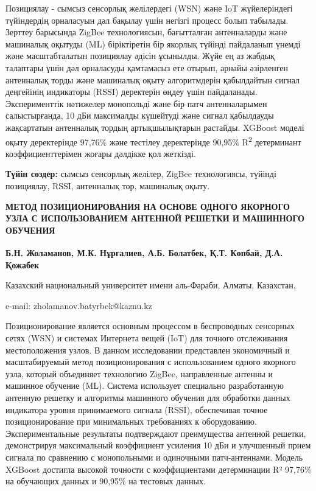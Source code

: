 Позициялау - сымсыз сенсорлық желілердегі (WSN) және IoT жүйелеріндегі
түйіндердің орналасуын дәл бақылау үшін негізгі процесс болып табылады.
Зерттеу барысында ZigBee технологиясын, бағытталған антенналарды және
машиналық оқытуды (ML) біріктіретін бір якорлық түйінді пайдаланып
үнемді және масштабталатын позициялау әдісін ұсынылды. Жүйе ең аз жабдық
талаптары үшін дәл орналасуды қамтамасыз ете отырып, арнайы әзірленген
антенналық торды және машиналық оқыту алгоритмдерін қабылдайтын сигнал
деңгейінің индикаторы (RSSI) деректерін өңдеу үшін пайдаланады.
Эксперименттік нәтижелер монопольді және бір патч антенналарымен
салыстырғанда, 10 дБи максималды күшейтуді және сигнал қабылдауды
жақсартатын антенналық тордың артықшылықтарын растайды. XGBoost моделі
оқыту деректерінде 97,76\% және тестілеу деректерінде 90,95\%
R\textsuperscript{2} детерминант коэффициенттерімен жоғары дәлдікке қол
жеткізді.

{\bfseries Түйін сөздер:} сымсыз сенсорлық желілер, ZigBee технологиясы,
түйінді позициялау, RSSI, антенналық тор, машиналық оқыту.

\begin{articleheader}
{\bfseries МЕТОД ПОЗИЦИОНИРОВАНИЯ НА ОСНОВЕ ОДНОГО ЯКОРНОГО УЗЛА С
ИСПОЛЬЗОВАНИЕМ АНТЕННОЙ РЕШЕТКИ И МАШИННОГО ОБУЧЕНИЯ}

{\bfseries
Б.Н. Жоламанов\textsuperscript{\envelope },
М.К. Нұрғалиев,
А.Б. Болатбек,
Қ.Т. Көпбай,
Д.А. Қожабек
}
\end{articleheader}

\begin{affiliation}
Казахский национальный университет имени аль-Фараби, Алматы, Казахстан,

e-mail: zholamanov.batyrbek@kaznu.kz
\end{affiliation}

Позиционирование является основным процессом в беспроводных сенсорных
сетях (WSN) и системах Интернета вещей (IoT) для точного отслеживания
местоположения узлов. В данном исследовании представлен экономичный и
масштабируемый метод позиционирования с использованием одного якорного
узла, который объединяет технологию ZigBee, направленные антенны и
машинное обучение (ML). Система использует специально разработанную
антенную решетку и алгоритмы машинного обучения для обработки данных
индикатора уровня принимаемого сигнала (RSSI), обеспечивая точное
позиционирование при минимальных требованиях к оборудованию.
Экспериментальные результаты подтверждают преимущества антенной решетки,
демонстрируя максимальный коэффициент усиления 10 дБи и улучшенный прием
сигнала по сравнению с монопольными и одиночными патч-антеннами. Модель
XGBoost достигла высокой точности с коэффициентами детерминации R²
97,76\% на обучающих данных и 90,95\% на тестовых данных.

